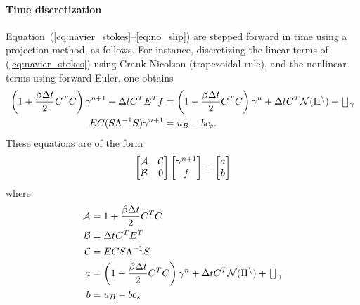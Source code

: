 \documentclass[11pt]{article}
\begin{document}
\paragraph{Time discretization}
Equation~(\ref{eq:navier_stokes}--\ref{eq:no_slip}) are stepped forward in time using a projection method, as follows.  For instance, discretizing the linear terms of (\ref{eq:navier_stokes}) using Crank-Nicolson (trapezoidal rule), and the nonlinear terms using forward Euler, one obtains
\begin{align}
	\left(1+\frac{\beta\Delta t}{2}C^TC\right)\gamma^{n+1} + \Delta t C^TE^Tf &= \left(1 - \frac{\beta\Delta t}{2}C^TC\right)\gamma^n + \Delta t C^T \cal{N}(q^n) + bc_\gamma \label{eq:timestepper}\\
	EC(S\Lambda^{-1}S)\gamma^{n+1} &= u_B - bc_s.
\end{align}
These equations are of the form
\begin{equation}
	\begin{bmatrix}
		\cal{A} & \cal{C}\\\cal{B} & 0
	\end{bmatrix}
	\begin{bmatrix}
		\gamma^{n+1}\\ f
	\end{bmatrix}
	=
	\begin{bmatrix}
		a\\b
	\end{bmatrix}
\label{eq:constrained}
\end{equation}
where
\begin{align}
	\cal{A} &= 1 + \frac{\beta\Delta t}{2}C^TC\\
	\cal{B} &= \Delta t C^TE^T\\
	\cal{C} &= ECS\Lambda^{-1}S\\
	a &= \left(1-\frac{\beta\Delta t}{2}C^TC\right)\gamma^n + \Delta t C^T\cal{N}(q^n) + bc_\gamma\\
	b &= u_B - bc_s
\end{align}
\end{document}
